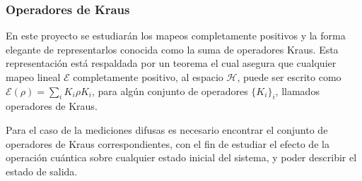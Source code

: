 \subsubsection{Operadores de Kraus}

En este proyecto se estudiarán los mapeos completamente positivos y la forma elegante de representarlos conocida como la suma de operadores Kraus. Esta representación está respaldada por un teorema el cual asegura que cualquier mapeo lineal $\mathcal{E}$   completamente positivo, al espacio $\mathcal{H}$, puede ser escrito como $\mathcal{E}(\rho)=\sum_iK_i\rho K_i$, para algún conjunto de operadores $\{K_i\}_i$, llamados operadores de Kraus.

Para el caso de la mediciones difusas es necesario encontrar el conjunto de operadores de Kraus correspondientes, con el fin de estudiar el efecto de la operación cuántica sobre cualquier estado inicial del sistema, y poder describir el estado de salida.









